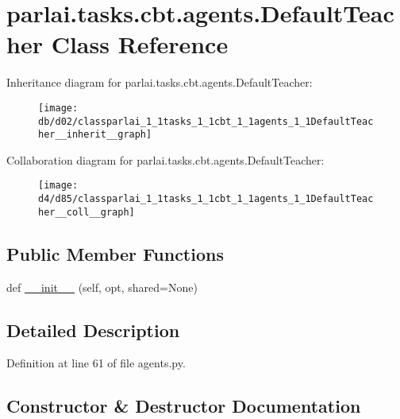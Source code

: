 \hypertarget{classparlai_1_1tasks_1_1cbt_1_1agents_1_1DefaultTeacher}{}\section{parlai.\+tasks.\+cbt.\+agents.\+Default\+Teacher Class Reference}
\label{classparlai_1_1tasks_1_1cbt_1_1agents_1_1DefaultTeacher}


Inheritance diagram for parlai.\+tasks.\+cbt.\+agents.\+Default\+Teacher\+:\nopagebreak
\begin{figure}[H]
\begin{center}
\leavevmode
\texttt{[image: db/d02/classparlai\_1\_1tasks\_1\_1cbt\_1\_1agents\_1\_1DefaultTeacher\_\_inherit\_\_graph]}
\end{center}
\end{figure}


Collaboration diagram for parlai.\+tasks.\+cbt.\+agents.\+Default\+Teacher\+:\nopagebreak
\begin{figure}[H]
\begin{center}
\leavevmode
\texttt{[image: d4/d85/classparlai\_1\_1tasks\_1\_1cbt\_1\_1agents\_1\_1DefaultTeacher\_\_coll\_\_graph]}
\end{center}
\end{figure}
\subsection*{Public Member Functions}
\begin{DoxyCompactItemize}
\item 
def \hyperlink{classparlai_1_1tasks_1_1cbt_1_1agents_1_1DefaultTeacher_a2a25b29b63e7edb52d411115ee5e2030}{\+\_\+\+\_\+init\+\_\+\+\_\+} (self, opt, shared=None)
\end{DoxyCompactItemize}


\subsection{Detailed Description}


Definition at line 61 of file agents.\+py.



\subsection{Constructor \& Destructor Documentation}
\mbox{\label{classparlai_1_1tasks_1_1cbt_1_1agents_1_1DefaultTeacher_a2a25b29b63e7edb52d411115ee5e2030}} 
